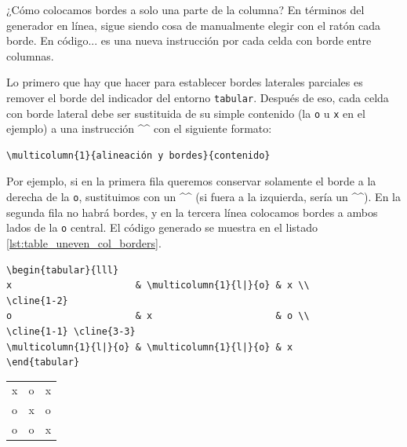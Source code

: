 ¿Cómo colocamos bordes a solo una parte de la columna? En términos del generador en línea, sigue siendo cosa de manualmente elegir con el ratón cada borde. En código... es una nueva instrucción por cada celda con borde entre columnas.

Lo primero que hay que hacer para establecer bordes laterales parciales es remover el borde del indicador del entorno \texttt{tabular}. Después de eso, cada celda con borde lateral debe ser sustituida de su simple contenido (la \texttt{o} u \texttt{x} en el ejemplo) a una instrucción ^\multicolumn^ con el siguiente formato:

\begin{lstlisting}[style=latex,numbers=none]
\multicolumn{1}{alineación y bordes}{contenido}
\end{lstlisting}

Por ejemplo, si en la primera fila queremos conservar solamente el borde a la derecha de la \texttt{o}, sustituimos con un ^^ (si fuera a la izquierda, sería un ^^). En la segunda fila no habrá bordes, y en la tercera línea colocamos bordes a ambos lados de la \texttt{o} central. El código generado se muestra en el listado \ref{lst:table_uneven_col_borders}.

\noindent \begin{minipage}[ht!]{.80\linewidth}
\begin{lstlisting}[style=latex,frame={},caption={Código de tabla con bordes incompletos para columnas.},label={lst:table_uneven_col_borders}]
\begin{tabular}{lll}
x                      & \multicolumn{1}{l|}{o} & x \\
\cline{1-2}
o                      & x                      & o \\
\cline{1-1} \cline{3-3}
\multicolumn{1}{l|}{o} & \multicolumn{1}{l|}{o} & x
\end{tabular}
\end{lstlisting}
\end{minipage}
\begin{minipage}[ht!]{.19\linewidth}
\begin{center}
	\vspace{-0.7cm}
	\begin{tabular}{lll}
		x                      & \multicolumn{1}{l|}{o} & x \\ \cline{1-2}
		o                      & x                      & o \\ \cline{1-1} \cline{3-3} 
		\multicolumn{1}{l|}{o} & \multicolumn{1}{l|}{o} & x
	\end{tabular}
\end{center}
\end{minipage}

